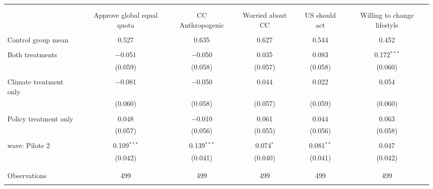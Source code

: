 
\begin{tabular}{@{\extracolsep{5pt}}lccccc} 
\\[-1.8ex]\hline 
\hline \\[-1.8ex] 
\\[-1.8ex] & Approve global equal quota & CC Anthropogenic & Worried about CC & US should act & Willing to change lifestyle \\ 
\hline \\[-1.8ex] 
 Control group mean & 0.527 & 0.635 & 0.627 & 0.544 & 0.452  \\ \hline \\[-1.8ex] Both treatments & $-$0.051 & $-$0.050 & 0.035 & 0.083 & 0.172$^{***}$ \\ 
  & (0.059) & (0.058) & (0.057) & (0.058) & (0.060) \\ 
  & & & & & \\ 
 Climate treatment only & $-$0.081 & $-$0.050 & 0.044 & 0.022 & 0.054 \\ 
  & (0.060) & (0.058) & (0.057) & (0.059) & (0.060) \\ 
  & & & & & \\ 
 Policy treatment only & 0.048 & $-$0.010 & 0.061 & 0.044 & 0.063 \\ 
  & (0.057) & (0.056) & (0.055) & (0.056) & (0.058) \\ 
  & & & & & \\ 
 wave: Pilote 2 & 0.109$^{***}$ & 0.139$^{***}$ & 0.074$^{*}$ & 0.081$^{**}$ & 0.047 \\ 
  & (0.042) & (0.041) & (0.040) & (0.041) & (0.042) \\ 
  & & & & & \\ 
\hline \\[-1.8ex] 

Observations & 499 & 499 & 499 & 499 & 499 \\ 
\hline 
\hline \\[-1.8ex] 
\end{tabular} 